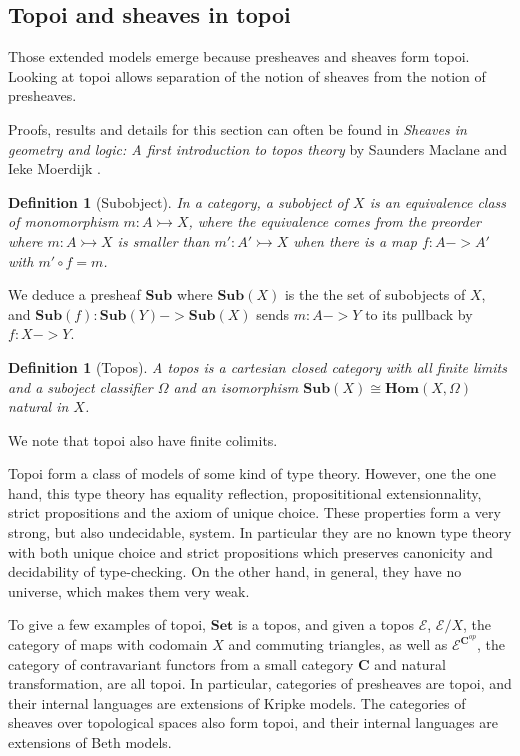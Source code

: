 \documentclass[11pt]{article}
\newtheorem{definition}[theorem]{Definition}
\newcommand{\0}{\mathbf{0}}
\newcommand{\1}{\mathbf{1}}
\newcommand{\mono}{\rightarrowtail}
\begin{document}
\subsection{Topoi and sheaves in topoi}\label{topoi}

Those extended models emerge because presheaves and sheaves form topoi. Looking at topoi allows separation of the notion of sheaves from the notion of presheaves.

Proofs, results and details for this section can often be found in \emph{Sheaves in geometry and logic: A first introduction to topos theory} by Saunders Maclane and Ieke Moerdijk \cite{maclane2012sheaves}.

\begin{definition}[Subobject]
    In a category, a \emph{subobject} of $X$ is an equivalence class of monomorphism $m : A \mono X$, where the equivalence comes from the preorder where $ m : A \mono X $ is smaller than $ m' : A' \mono X$ when there is a map $f : A -> A'$ with $ m' \circ f = m$.
\end{definition}

We deduce a presheaf $\mathbf{Sub}$ where $\mathbf{Sub}(X)$ is the the set of subobjects of $X$, and $\mathbf{Sub}(f) : \mathbf{Sub}(Y) -> \mathbf{Sub}(X)$ sends $m : A -> Y$ to its pullback by $f : X -> Y $. 

\begin{definition}[Topos]\label{topos}
    A \emph{topos} is a cartesian closed category with all finite limits and a suboject \emph{classifier} $\Omega$ and an isomorphism $\mathbf{Sub}(X)\cong \mathbf{Hom}(X, \Omega)$ natural in $X$.
\end{definition}

We note that topoi also have finite colimits.

Topoi form a class of models of some kind of type theory.
However, one the one hand, this type theory has equality reflection, proposititional extensionnality, strict propositions and the axiom of unique choice.
These properties form a very strong, but also undecidable, system.
In particular they are no known type theory with both unique choice and strict propositions which preserves canonicity and decidability of type-checking.
On the other hand, in general, they have no universe, which makes them very weak.


To give a few examples of topoi, $\mathbf{Set}$ is a topos, and given a topos $\mathcal E$, $\mathcal{E}/X$, the category of maps with codomain $X$ and commuting triangles, as well as $\mathcal{E}^{\mathbf{C}^{op}}$, the category of contravariant functors from a small category $\mathbf{C}$ and natural transformation, are all topoi.
In particular, categories of presheaves are topoi, and their internal languages are extensions of Kripke models. The categories of sheaves over topological spaces also form topoi, and their internal languages are extensions of Beth models.
\end{document}
